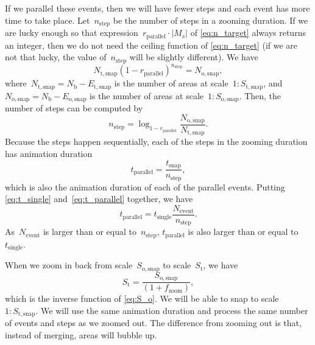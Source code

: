 \documentclass[]{interact}
\begin{document}
If we parallel these events, 
then we will have fewer steps and 
each event has more time to take place.
Let~$n_\mathrm{step}$ be the number of steps in a zooming duration.
If we are lucky enough so that
expression~$r_\mathrm{parallel} \cdot |M_s|$ of \eq\ref{eq:n_target}
always returns an integer, 
then we do not need the ceiling function of \eq\ref{eq:n_target}
(if we are not that lucky, the value of~$n_\mathrm{step}$ will be slightly different).
We have 
\begin{equation*}
N_\mathrm{t,snap} (1-r_\mathrm{parallel})^{n_\mathrm{step}} = N_\mathrm{o,snap},
\end{equation*}
where~$N_\mathrm{t,snap} = N_\mathrm{b}- E_\mathrm{t,snap}$ 
is the number of areas at scale~$1:S_\mathrm{t,snap}$,
and~$N_\mathrm{o,snap} = N_\mathrm{b}- E_\mathrm{o,snap}$
is the number of areas at scale~$1:S_\mathrm{o,snap}$.
Then, the number of steps can be computed by
\begin{equation*}
n_\mathrm{step} = \log_{1-r_\mathrm{parallel}} 
    \frac{N_\mathrm{o,snap}}{N_\mathrm{t,snap}}.
\end{equation*}
Because the steps happen sequentially,
each of the steps in the zooming duration has
animation duration
\begin{equation}
\label{eq:t_parallel}
t_\mathrm{parallel} = \frac{t_\mathrm{snap}}{n_\mathrm{step}},
\end{equation}
which is also the animation duration of each of the parallel events.
Putting \eqs\ref{eq:t_single} and~\ref{eq:t_parallel} together,
we have
\begin{equation*}
\label{eq:t_compare_appx}
t_\mathrm{parallel} = t_\mathrm{single}  \frac{N_\mathrm{event}}{n_\mathrm{step}}.
\end{equation*}
As~$N_\mathrm{event}$ is larger than or equal to~$n_\mathrm{step}$,
$t_\mathrm{parallel}$ is also larger than or equal to~$t_\mathrm{single}$.


When we zoom in back from scale~$S_\mathrm{o,snap}$ to scale~$S_\mathrm{t}$, 
we have
\begin{equation*}
\label{eq:S_i}
S_\mathrm{t} = \frac{S_\mathrm{o,snap}}{(1 + f_\mathrm{zoom})},
\end{equation*}
which is the inverse function of \eq\ref{eq:S_o}.
We will be able to snap to scale~$1:S_\mathrm{t,snap}$.
We will use the same animation duration and 
process the same number of events and steps as we zoomed out.
The difference from zooming out is that, instead of merging, 
areas will bubble up.
\end{document}
